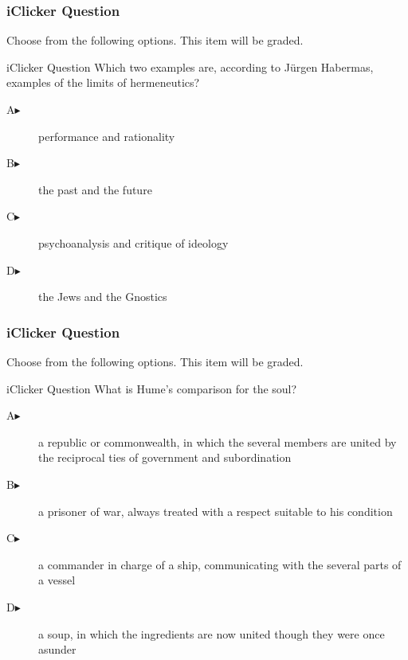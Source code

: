 \documentclass[xcolor=dvipsnames]{beamer}
\begin{document}
\begin{frame}
  \frametitle{iClicker Question}
Choose from the following options. This item will be graded.
\begin{block}{iClicker Question}
Which two examples are, according to J{\"u}rgen Habermas, examples of
the limits of hermeneutics?
\end{block}
\begin{description}
\item[A\hspace{.2in}$\blacktriangleright$] performance and rationality
\item[B\hspace{.2in}$\blacktriangleright$] the past and the future
\item[C\hspace{.2in}$\blacktriangleright$] psychoanalysis and critique of ideology
\item[D\hspace{.2in}$\blacktriangleright$] the Jews and the Gnostics
\end{description}
\end{frame}

\begin{frame}
  \frametitle{iClicker Question}
Choose from the following options. This item will be graded.
\begin{block}{iClicker Question}
What is Hume's comparison for the soul?
\end{block}
\begin{description}
\item[A\hspace{.2in}$\blacktriangleright$] a republic or commonwealth, in which the several members are united by the reciprocal ties of government and subordination
\item[B\hspace{.2in}$\blacktriangleright$] a prisoner of war, always treated with a respect suitable to his condition
\item[C\hspace{.2in}$\blacktriangleright$] a commander in charge of a ship, communicating with the several parts of a vessel
\item[D\hspace{.2in}$\blacktriangleright$] a soup, in which the ingredients are now united though they were once asunder
\end{description}
\end{frame}
\end{document}
